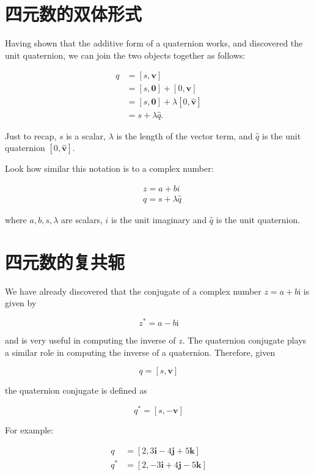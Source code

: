 \section{四元数的双体形式}
Having shown that the additive form of a quaternion works, and discovered the unit quaternion, we can join the two objects together as follows:

$$
    \begin{aligned}
        q & =[s, \mathbf{v}]                              \\
          & =[s, \mathbf{0}]+[0, \mathbf{v}]              \\
          & =[s, \mathbf{0}]+\lambda[0, \hat{\mathbf{v}}] \\
          & =s+\lambda \hat{q} .
    \end{aligned}
$$

Just to recap, $s$ is a scalar, $\lambda$ is the length of the vector term, and $\hat{q}$ is the unit quaternion $[0, \hat{\mathbf{v}}]$.

Look how similar this notation is to a complex number:

$$
    \begin{aligned}
         & z=a+b i             \\
         & q=s+\lambda \hat{q}
    \end{aligned}
$$

where $a, b, s, \lambda$ are scalars, $i$ is the unit imaginary and $\hat{q}$ is the unit quaternion.

\section{四元数的复共轭}
We have already discovered that the conjugate of a complex number $z=a+b \mathrm{i}$ is given by

$$
    z^{*}=a-b \mathrm{i}
$$

and is very useful in computing the inverse of $z$. The quaternion conjugate plays a similar role in computing the inverse of a quaternion. Therefore, given

$$
    q=[s, \mathbf{v}]
$$

the quaternion conjugate is defined as

$$
    q^{*}=[s,-\mathbf{v}]
$$

For example:

$$
    \begin{aligned}
        q     & =[2,3 \mathbf{i}-4 \mathbf{j}+5 \mathbf{k}]  \\
        q^{*} & =[2,-3 \mathbf{i}+4 \mathbf{j}-5 \mathbf{k}]
    \end{aligned}
$$

